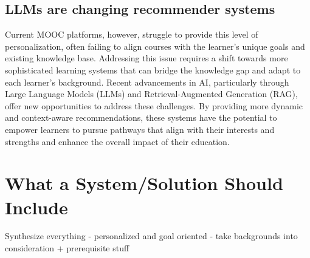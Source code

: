 \subsection{LLMs are changing recommender systems}

Current MOOC platforms, however, struggle to provide this level of personalization, often failing to align courses with the learner’s unique goals and existing knowledge base. Addressing this issue requires a shift towards more sophisticated learning systems that can bridge the knowledge gap and adapt to each learner’s background. Recent advancements in AI, particularly through Large Language Models (LLMs) and Retrieval-Augmented Generation (RAG), offer new opportunities to address these challenges. By providing more dynamic and context-aware recommendations, these systems have the potential to empower learners to pursue pathways that align with their interests and strengths and enhance the overall impact of their education.


\section{What a System/Solution Should Include}

Synthesize everything 
- personalized and goal oriented
- take backgrounds into consideration + prerequisite stuff 

